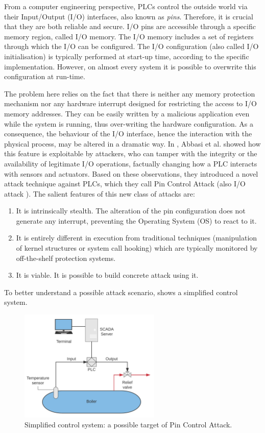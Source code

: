 From a computer engineering perspective, PLCs control the outside world via their Input/Output (I/O) interfaces, also known as \emph{pins}.
Therefore, it is crucial that they are both reliable and secure. I/O pins are accessible through a specific memory region, called I/O memory.
The I/O memory includes a set of registers through which the I/O can be configured. The I/O configuration (also called I/O initialisation) is typically performed at start-up time,
according to the specific implementation. However, on almost every system it is possible to overwrite this configuration at run-time.

The problem here relies on the fact that there is neither any memory protection mechanism nor any hardware interrupt designed for restricting the access to I/O memory addresses.
They can be easily written by a malicious application even while the system is running, thus over-writing the hardware configuration.
As a consequence, the behaviour of the I/O interface, hence the interaction with the physical process, may be altered in a dramatic way.
In \cite{ghostplc}, Abbasi et al. showed how this feature is exploitable by attackers, who can tamper with
the integrity or the availability of legitimate I/O operations, factually changing how a PLC interacts with sensors and actuators.
Based on these observations, they introduced a novel attack technique against PLCs, which they call Pin Control Attack (also I/O attack \cite{tech_ghostplc}).
The salient features of this new class of attacks are:
\begin{enumerate}[itemsep=2pt,topsep=0pt]
	\item It is intrinsically stealth. The alteration of the pin configuration does not generate any interrupt, preventing the Operating System (OS) to react to it.
	\item It is entirely different in execution from traditional techniques (\eg manipulation of kernel structures or system call hooking) which are typically
		monitored by off-the-shelf protection systems.
	\item It is viable. It is possible to build concrete attack using it.
\end{enumerate}

To better understand a possible attack scenario,  shows a simplified control system.
\begin{figure}[h!]
\centerline{\includegraphics[width=0.6\textwidth]{res/control}}
\caption{Simplified control system: a possible target of Pin Control Attack.\label{fig:control}}
\end{figure}

